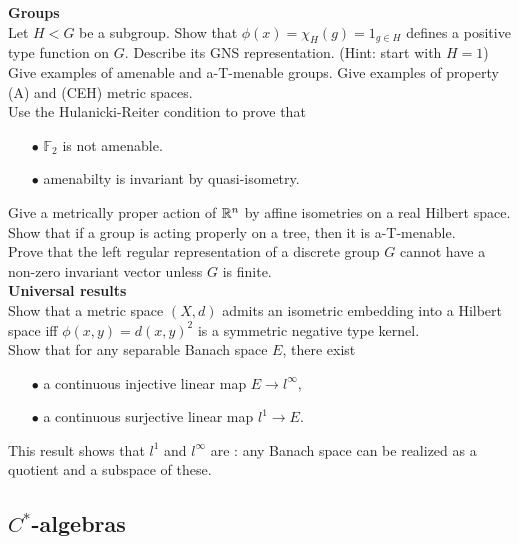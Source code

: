 \textbf{Groups} \\

Let $H<G$ be a subgroup. Show that $\phi(x)=\chi_H(g)= 1_{g\in H}$ defines a positive type function on $G$. Describe its GNS representation. (Hint: start with $H=1$)\\

Give examples of amenable and a-T-menable groups. Give examples of property (A) and (CEH) metric spaces.\\ 

Use the Hulanicki-Reiter condition to prove that
\begin{itemize}
\item[$\bullet$] $\mathbb F_2$ is not amenable.
\item[$\bullet$] amenabilty is invariant by quasi-isometry.	
\end{itemize}

Give a  metrically proper action of $\mathbb R^n$ by affine isometries on a real Hilbert space.\\

Show that if a group is acting properly on a tree, then it is a-T-menable.\\

Prove that the left regular representation of a discrete group $G$ cannot have a non-zero invariant vector unless $G$ is finite.\\

\textbf{Universal results} \\

Show that a metric space $(X,d)$ admits an isometric embedding into a Hilbert space iff $\phi(x,y) = d(x,y)^2$ is a symmetric negative type kernel.\\

Show that for any separable Banach space $E$, there exist
\begin{itemize}
\item[$\bullet$] a continuous injective linear map $E\rightarrow l^\infty$,
\item[$\bullet$] a continuous surjective linear map $l^1 \rightarrow E$.   
\end{itemize}
This result shows that $l^1$ and $l^\infty$ are : any Banach space can be realized as a quotient and a subspace of these.

\subsection{$C^*$-algebras}

